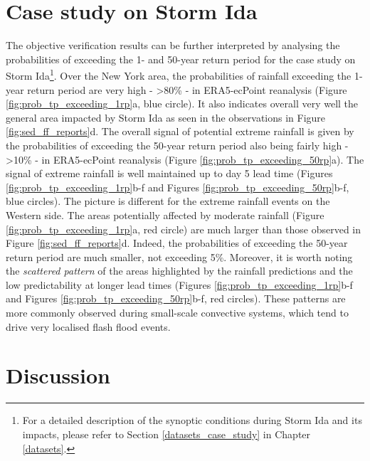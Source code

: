 \section{Case study on Storm Ida}
\label{flash_flood_focused_verification_rainfall_based_ff_case_study}

The objective verification results can be further interpreted by analysing the probabilities of exceeding the 1- and 50-year return period for the case study on Storm Ida\footnote{For a detailed description of the synoptic conditions during Storm Ida and its impacts, please refer to Section \ref{datasets_case_study} in Chapter \ref{datasets}.}. Over the New York area, the probabilities of rainfall exceeding the 1-year return period are very high - >80\% - in ERA5-ecPoint reanalysis (Figure  \ref{fig:prob_tp_exceeding_1rp}a, blue circle). It also indicates overall very well the general area impacted by Storm Ida as seen in the observations in Figure \ref{fig:sed_ff_reports}d. The overall signal of potential extreme rainfall is given by the probabilities of exceeding the 50-year return period also being fairly high - >10\% - in ERA5-ecPoint reanalysis (Figure \ref{fig:prob_tp_exceeding_50rp}a). The signal of extreme rainfall is well maintained up to day 5 lead time (Figures \ref{fig:prob_tp_exceeding_1rp}b-f and Figures \ref{fig:prob_tp_exceeding_50rp}b-f, blue circles). The picture is different for the extreme rainfall events on the Western side. The areas potentially affected by moderate rainfall (Figure  \ref{fig:prob_tp_exceeding_1rp}a, red circle) are much larger than those observed in Figure \ref{fig:sed_ff_reports}d. Indeed, the probabilities of exceeding the 50-year return period are much smaller, not exceeding 5\%. Moreover, it is worth noting the \textit{scattered pattern} of the areas highlighted by the rainfall predictions and the low predictability at longer lead times (Figures \ref{fig:prob_tp_exceeding_1rp}b-f and Figures \ref{fig:prob_tp_exceeding_50rp}b-f, red circles). These patterns are more commonly observed during small-scale convective systems, which tend to drive very localised flash flood events.


\section{Discussion}
\label{flash_flood_focused_verification_rainfall_based_ff_discussion}

